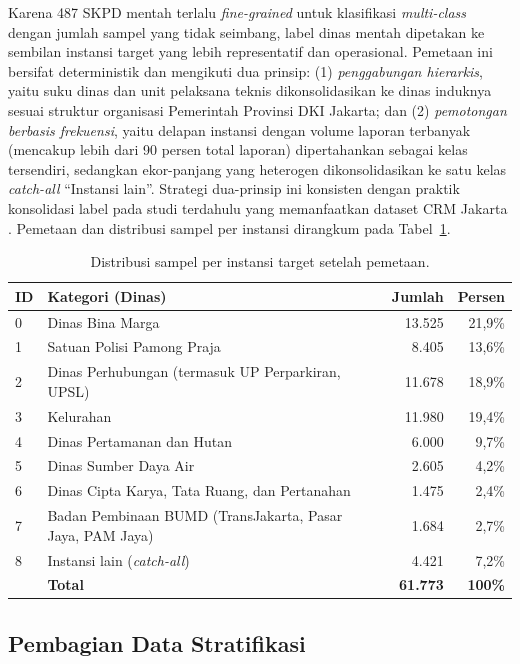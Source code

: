 Karena 487 SKPD mentah terlalu \textit{fine-grained} untuk klasifikasi \textit{multi-class} dengan jumlah sampel yang tidak seimbang, label dinas mentah dipetakan ke sembilan instansi target yang lebih representatif dan operasional. Pemetaan ini bersifat deterministik dan mengikuti dua prinsip: (1) \textit{penggabungan hierarkis}, yaitu suku dinas dan unit pelaksana teknis dikonsolidasikan ke dinas induknya sesuai struktur organisasi Pemerintah Provinsi DKI Jakarta; dan (2) \textit{pemotongan berbasis frekuensi}, yaitu delapan instansi dengan volume laporan terbanyak (mencakup lebih dari 90 persen total laporan) dipertahankan sebagai kelas tersendiri, sedangkan ekor-panjang yang heterogen dikonsolidasikan ke satu kelas \textit{catch-all} ``Instansi lain''. Strategi dua-prinsip ini konsisten dengan praktik konsolidasi label pada studi terdahulu yang memanfaatkan dataset CRM Jakarta \citep{hanifPenugasanOtomatis2024}. Pemetaan dan distribusi sampel per instansi dirangkum pada Tabel~\ref{tab:kategori-target}.

\begin{table}[htbp]
\centering
\caption{Distribusi sampel per instansi target setelah pemetaan.}
\label{tab:kategori-target}
\begin{tabular}{p{0.7cm} p{6.5cm} r r}
\toprule
\textbf{ID} & \textbf{Kategori (Dinas)} & \textbf{Jumlah} & \textbf{Persen} \\
\midrule
0 & Dinas Bina Marga & 13.525 & 21,9\% \\
1 & Satuan Polisi Pamong Praja & 8.405 & 13,6\% \\
2 & Dinas Perhubungan (termasuk UP Perparkiran, UPSL) & 11.678 & 18,9\% \\
3 & Kelurahan & 11.980 & 19,4\% \\
4 & Dinas Pertamanan dan Hutan & 6.000 & 9,7\% \\
5 & Dinas Sumber Daya Air & 2.605 & 4,2\% \\
6 & Dinas Cipta Karya, Tata Ruang, dan Pertanahan & 1.475 & 2,4\% \\
7 & Badan Pembinaan BUMD (TransJakarta, Pasar Jaya, PAM Jaya) & 1.684 & 2,7\% \\
8 & Instansi lain (\textit{catch-all}) & 4.421 & 7,2\% \\
\midrule
& \textbf{Total} & \textbf{61.773} & \textbf{100\%} \\
\bottomrule
\end{tabular}
\end{table}

\subsection{Pembagian Data Stratifikasi}

